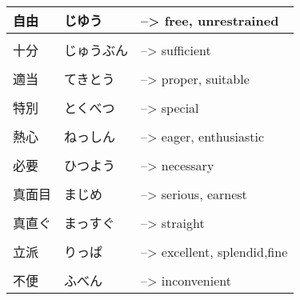 \documentclass{article}
\begin{document}
\begin{tabular}{ l | l l }
自由&じゆう&--> free, unrestrained\\ \hline\\[-1em]
十分&じゅうぶん&--> sufficient\\ \hline\\[-1em]
適当 	&てきとう&--> proper, suitable\\ \hline\\[-1em]
特別 	&とくべつ &--> special\\ \hline\\[-1em]
熱心 	&ねっしん &--> eager, enthusiastic\\ \hline\\[-1em]
必要 	&ひつよう &--> necessary\\ \hline\\[-1em]
真面目 	&まじめ &--> serious, earnest\\ \hline\\[-1em]
真直ぐ 	&まっすぐ&--> straight\\ \hline\\[-1em]
立派 	&りっぱ &--> excellent, splendid,fine\\ \hline\\[-1em]
不便 	&ふべん &--> inconvenient   %
\end{tabular}
\end{document}
